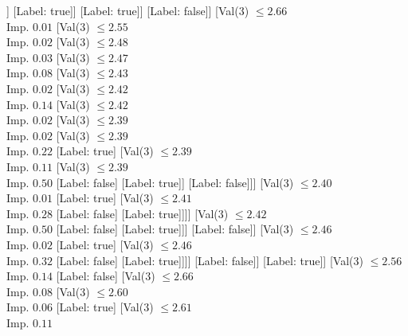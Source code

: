 \documentclass[margin=10pt]{standalone}
\begin{document}
\begin{forest}
																]
															[Label: true]]
														[Label: true]]
													[Label: false]]
												[Val($3$) $ \leq 2.66$ \\ Imp. $0.01$
													[Val($3$) $ \leq 2.55$ \\ Imp. $0.02$
														[Val($3$) $ \leq 2.48$ \\ Imp. $0.03$
															[Val($3$) $ \leq 2.47$ \\ Imp. $0.08$
																[Val($3$) $ \leq 2.43$ \\ Imp. $0.02$
																	[Val($3$) $ \leq 2.42$ \\ Imp. $0.14$
																		[Val($3$) $ \leq 2.42$ \\ Imp. $0.02$
																			[Val($3$) $ \leq 2.39$ \\ Imp. $0.02$
																				[Val($3$) $ \leq 2.39$ \\ Imp. $0.22$
																					[Label: true]
																					[Val($3$) $ \leq 2.39$ \\ Imp. $0.11$
																						[Val($3$) $ \leq 2.39$ \\ Imp. $0.50$
																							[Label: false]
																							[Label: true]]
																						[Label: false]]]
																				[Val($3$) $ \leq 2.40$ \\ Imp. $0.01$
																					[Label: true]
																					[Val($3$) $ \leq 2.41$ \\ Imp. $0.28$
																						[Label: false]
																						[Label: true]]]]
																			[Val($3$) $ \leq 2.42$ \\ Imp. $0.50$
																				[Label: false]
																				[Label: true]]]
																		[Label: false]]
																	[Val($3$) $ \leq 2.46$ \\ Imp. $0.02$
																		[Label: true]
																		[Val($3$) $ \leq 2.46$ \\ Imp. $0.32$
																			[Label: false]
																			[Label: true]]]]
																[Label: false]]
															[Label: true]]
														[Val($3$) $ \leq 2.56$ \\ Imp. $0.14$
															[Label: false]
															[Val($3$) $ \leq 2.66$ \\ Imp. $0.08$
																[Val($3$) $ \leq 2.60$ \\ Imp. $0.06$
																	[Label: true]
																	[Val($3$) $ \leq 2.61$ \\ Imp. $0.11$

\end{forest}
\end{document}
